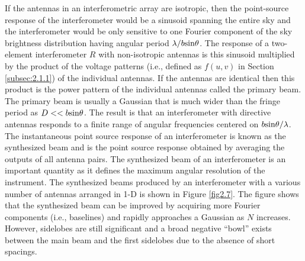 If the antennas in an interferometric array are isotropic, then the  point-source response of the interferometer would be a sinusoid spanning the entire sky and the interferometer would be only sensitive to one Fourier component of the sky brightness distribution having angular period $\lambda/b\rm{sin}\theta$. The response of a two-element interferometer $R$ with non-isotropic antennas is this sinusoid multiplied by the product of the voltage patterns (i.e., defined as $f(u,v)$ in Section \ref{subsec:2.1.1}) of the individual antennas. If the antennas are identical then this product is the power pattern of the individual antennas called the primary beam. The primary beam is usually a Gaussian that is much wider than the fringe period as $D << b\rm{sin}\theta$. The result is that an interferometer with directive antennas responds to a finite range of angular frequencies centered on $b\rm{sin}\theta /\lambda$. The instantaneous point source response of an interferometer is known as the synthesized beam and is the point source response obtained by averaging the outputs of all antenna pairs. The synthesized beam of an interferometer is an important quantity as it defines the maximum angular resolution of the instrument. The synthesized beams produced by an interferometer with a various number of antennas arranged in 1-D is shown in Figure \ref{fig2.7}. The figure shows that the synthesized beam can be improved by acquiring more Fourier components (i.e., baselines) and rapidly approaches a Gaussian as $N$ increases. However, sidelobes are still significant and a broad negative ``bowl'' exists between the main beam and the first sidelobes due to the absence of short spacings.

